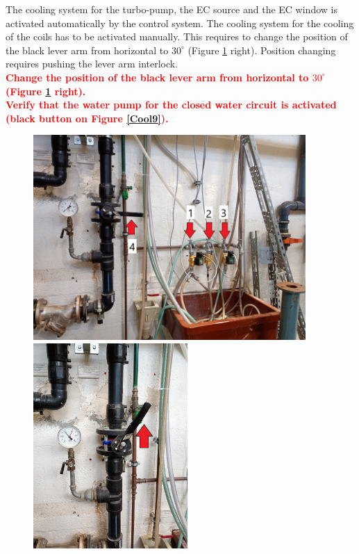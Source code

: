 \documentclass[fleqn,a4paper,20pt]{article}
\begin{document}
The cooling system for the turbo-pump, the EC source and the EC window is activated automatically by the control system. The cooling system for the cooling of the coils has to be activated manually. This requires to change the position of the black lever arm from horizontal to $30^\circ$ (Figure \ref{Cool2} right). Position changing requires pushing the lever arm interlock.\\

\textcolor{red}{\textbf{Change the position of the black lever arm from horizontal to $30^\circ$ (Figure \ref{Cool2} right).}}\\

\textcolor{red}{\textbf{Verify that the water pump for the closed water circuit is activated (black button on Figure \ref{Cool9}).}}\\

\begin{figure}[!h]
	\centering
	\includegraphics[height=7.8cm]{Cool2}
	\includegraphics[height=7.8cm]{Cool5}
	\captionsetup{width=0.8\textwidth}
	\label{Cool2}
\end{figure}
\end{document}
